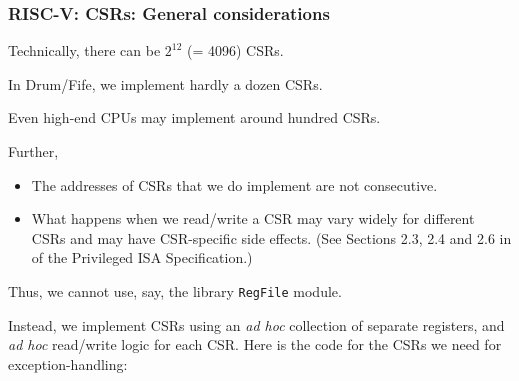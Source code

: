 \begin{frame}[fragile]
\frametitle{RISC-V: CSRs: General considerations}

\footnotesize

\vspace{2ex}

Technically, there can be $2^{12}$ (= 4096) CSRs.

\vspace{1ex}

In Drum/Fife, we implement hardly a dozen CSRs.

\vspace{1ex}

Even high-end CPUs may implement around hundred CSRs.

\vspace{1ex}

Further,
\begin{itemize}

\item The addresses of CSRs that we do implement are not consecutive.

\item What happens when we read/write a CSR may vary widely for
  different CSRs and may have CSR-specific side effects.  (See
  Sections 2.3, 2.4 and 2.6 in of the Privileged ISA Specification.)

\end{itemize}

\vspace{2ex}

Thus, we cannot use, say, the library {\tt RegFile} module.

\vspace{1ex}

Instead, we implement CSRs using an \emph{ad hoc} collection of
separate registers, and \emph{ad hoc} read/write logic for each CSR.
Here is the code for the CSRs we need for exception-handling:

\vspace{2ex}


\end{frame}


